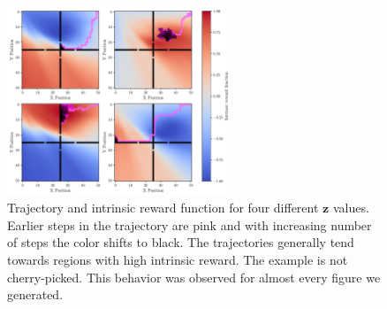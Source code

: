\begin{figure}[h!]
  \centering
  \includegraphics[width=0.6\textwidth]{figures/gridworld_value_function_trajectory.pdf}
  \caption{Trajectory and intrinsic reward function for four different $\textbf{z}$ values. Earlier steps in the trajectory are pink and with increasing number of steps the color shifts to black. The trajectories generally tend towards regions with high intrinsic reward. The example is not cherry-picked. This behavior was observed for almost every figure we generated.}
  \label{fig:gridworld-value-function-trajectories}
\end{figure}


